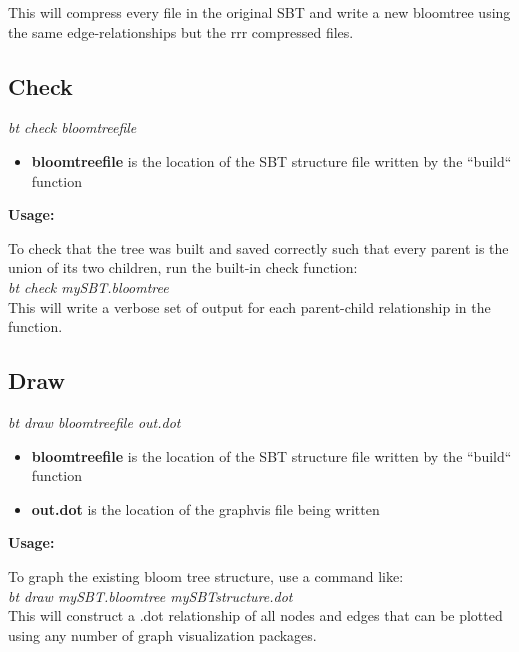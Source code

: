 \documentclass{article}
\begin{document}
This will compress every file in the original SBT and write a new bloomtree using the same edge-relationships but the rrr compressed files.

\subsection{Check}
\textit{bt check bloomtreefile}
\begin{itemize}
\item \textbf{bloomtreefile} is the location of the SBT structure file written by the ``build`` function
\end{itemize}
\textbf{Usage:}

To check that the tree was built and saved correctly such that every parent is the union of its two children, run the built-in check function: \\

\textit{bt check mySBT.bloomtree} \\

This will write a verbose set of output for each parent-child relationship in the function.

\subsection{Draw}
\textit{bt draw bloomtreefile out.dot}
\begin{itemize}
\item \textbf{bloomtreefile} is the location of the SBT structure file written by the ``build`` function
\item \textbf{out.dot} is the location of the graphvis file being written
\end{itemize}
\textbf{Usage:}

To graph the existing bloom tree structure, use a command like: \\

\textit{bt draw mySBT.bloomtree mySBTstructure.dot} \\

This will construct a .dot relationship of all nodes and edges that can be plotted using any number of graph visualization packages. %
\end{document}
